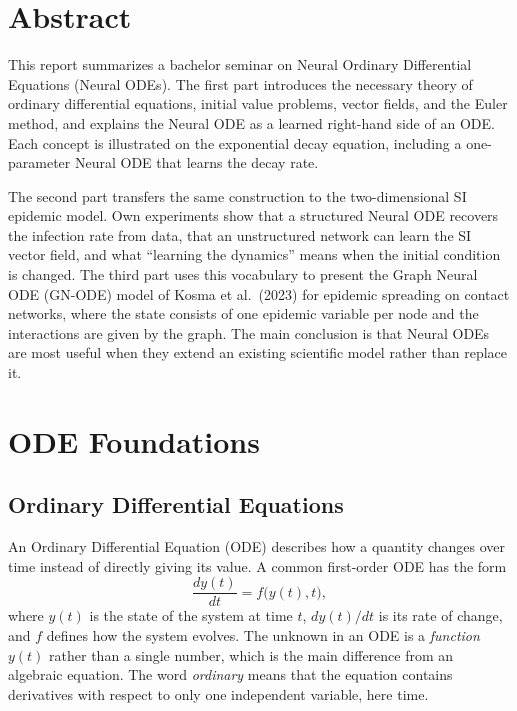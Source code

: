 \documentclass[11pt,a4paper]{article}
\begin{document}
\section*{Abstract}

This report summarizes a bachelor seminar on Neural Ordinary Differential
Equations (Neural ODEs). The first part introduces the necessary theory of
ordinary differential equations, initial value problems, vector fields, and the
Euler method, and explains the Neural ODE as a learned right-hand side of an
ODE. Each concept is illustrated on the exponential decay equation, including a
one-parameter Neural ODE that learns the decay rate.

The second part transfers the same construction to the two-dimensional SI
epidemic model. Own experiments show that a structured Neural ODE recovers the
infection rate from data, that an unstructured network can learn the SI vector
field, and what ``learning the dynamics'' means when the initial condition is
changed. The third part uses this vocabulary to present the Graph Neural ODE
(GN-ODE) model of Kosma et al.\ (2023) for epidemic spreading on contact
networks, where the state consists of one epidemic variable per node and the
interactions are given by the graph. The main conclusion is that Neural ODEs are
most useful when they extend an existing scientific model rather than replace it.


\section{ODE Foundations}

\subsection{Ordinary Differential Equations}

An Ordinary Differential Equation (ODE) describes how a quantity changes over
time instead of directly giving its value. A common first-order ODE has the form
\begin{equation}
  \frac{dy(t)}{dt} = f\bigl(y(t),t\bigr),
  \label{eq:ode}
\end{equation}
where $y(t)$ is the state of the system at time $t$, $dy(t)/dt$ is its rate of
change, and $f$ defines how the system evolves. The unknown in an ODE is a
\emph{function} $y(t)$ rather than a single number, which is the main difference
from an algebraic equation. The word \emph{ordinary} means that the equation
contains derivatives with respect to only one independent variable, here time.
\end{document}
